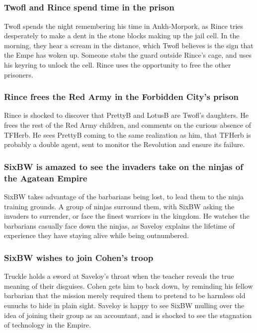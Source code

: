 \subsection{}
\subsubsection{\Gls{Twofl} and \Gls{Rince} spend time in the prison}
\Gls{Twofl} spends the night remembering his time in Ankh-Morpork, as \Gls{Rince} tries desperately
to make a dent in the stone blocks making up the jail cell. In the morning, they hear a scream in
the distance, which \Gls{Twofl} believes is the sign that the \Gls{Empe} has woken up. Someone stabs
the guard outside \Gls{Rince}'s cage, and uses his keyring to unlock the cell. \Gls{Rince} uses the
opportunity to free the other prisoners.

\subsubsection{\Gls{Rince} frees the Red Army in the Forbidden City's prison}
\Gls{Rince} is shocked to discover that \Gls{PrettyB} and \Gls{LotusB} are \Gls{Twofl}'s daughters.
He frees the rest of the Red Army children, and comments on the curious absence of \Gls{TFHerb}.
He sees \Gls{PrettyB} coming to the same realization as him, that \Gls{TFHerb} is probably a double
agent, sent to monitor the Revolution and ensure its failure.

\subsubsection{\Gls{SixBW} is amazed to see the invaders take on the ninjas of the Agatean Empire}
\Gls{SixBW} takes advantage of the barbarians being lost, to lead them to the ninja training
grounds. A group of ninjas surround them, with \Gls{SixBW} asking the invaders to surrender, or
face the finest warriors in the kingdom. He watches the barbarians casually face down the ninjas,
as \Gls{Saveloy} explains the lifetime of experience they have staying alive while being
outnumbered.

\subsubsection{\Gls{SixBW} wishes to join \Gls{Cohen}'s troop}
\Gls{Truckle} holds a sword at \Gls{Saveloy}'s throat when the teacher reveals the true meaning of
their disguises. \Gls{Cohen} gets him to back down, by reminding his fellow barbarian that the
mission merely required them to pretend to be harmless old eunuchs to hide in plain sight.
\Gls{Saveloy} is happy to see \Gls{SixBW} mulling over the idea of joining their group as an
accountant, and is shocked to see the stagnation of technology in the Empire.

